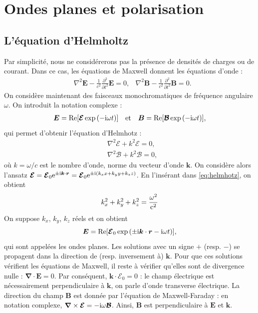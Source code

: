 \section{Ondes planes et polarisation}
\subsection{L'équation d'Helmholtz}
Par simplicité, nous ne considérerons pas la présence de densités de charges ou de courant. Dans ce cas, les équations de Maxwell donnent les équations d'onde :
\begin{align}
&\nabla^2\bm{E}-\frac{1}{c^2}\frac{\partial^2}{\partial t^2}\bm{E}=0,
&\nabla^2\bm{B}-\frac{1}{c^2}\frac{\partial^2}{\partial t^2}\bm{B}=0.
\end{align}
On considère maintenant des faisceaux monochromatiques de fréquence angulaire $\omega$. On introduit la notation complexe :
\begin{equation}
\begin{split}
\bm{E}=\text{Re}[\bm{\mathcal{E}}\exp{(-\mathrm{i}\omega t)}]
\end{split}
\quad\text{et}\quad
\begin{split}
\bm{B}=\text{Re}[\bm{\mathcal{B}}\exp{(-\mathrm{i}\omega t)}],
\end{split}
\end{equation}
qui permet d'obtenir l'équation d'Helmhotz :
\begin{align}
&\nabla^2\bm{\mathcal{E}}+k^2\bm{\mathcal{E}}=0,\nonumber\\
&\nabla^2\bm{\mathcal{B}}+k^2\bm{\mathcal{B}}=0,
\label{eq:helmhotz}
\end{align}
où $k=\omega/c$ est le nombre d'onde, norme du vecteur d'onde $\bm{k}$. On considère alors l'ansatz $\bm{\mathcal{E}}=\bm{\mathcal{E}}_0\mathrm{e}^{\pm\mathrm{i}\bm{k}\cdot\bm{r}} = \bm{\mathcal{E}}_0\mathrm{e}^{\pm\mathrm{i}(k_x x + k_y y + k_z z)}$. En l'insérant dans \ref{eq:helmhotz}, on obtient 
\begin{equation}
k_x^2+k_y^2+k_z^2=\frac{\omega^2}{\mathrm{c}^2}
\end{equation}
On suppose $k_x$, $k_y$, $k_z$ réels et on obtient 
\begin{equation}
\bm{E}=\text{Re}[\bm{\mathcal{E}}_0\exp{(\pm\mathrm{i}\bm{k}\cdot\bm{r}-\mathrm{i}\omega t)}],
\end{equation}
qui sont appelées les ondes planes. Les solutions avec un signe $+$ (resp. $-$) se propagent dans la direction de (resp. inversement à) $\bm{k}$. Pour que ces solutions vérifient les équations de Maxwell, il reste à vérifier qu'elles sont de divergence nulle : $\bm{\nabla}\cdot\bm{E} = 0$. Par conséquent, $\bm{k}\cdot\bm{\mathcal{E_0}}= 0$ : le champ électrique est nécessairement perpendiculaire à $\bm{k}$, on parle d'onde transverse électrique. La direction du champ $\bm{B}$ est donnée par l'équation de Maxwell-Faraday : en notation complexe, $\bm{\nabla}\times\bm{\mathcal{E}}=-\mathrm{i}\omega\bm{\mathcal{B}}$. Ainsi, $\bm{B}$ est perpendiculaire à $\bm{E}$ et $\bm{k}$.

